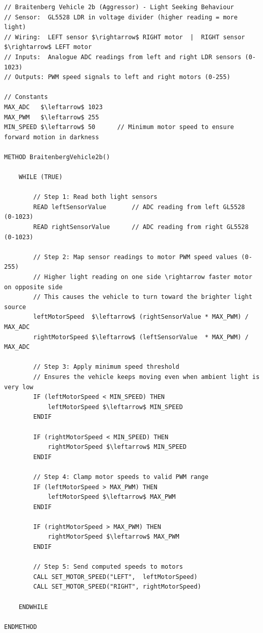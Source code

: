 \documentclass[11 pt , a 4 paper ]{article}
\theoremstyle{definition}
\begin{document}
\begin{lstlisting}[mathescape=true]
// Braitenberg Vehicle 2b (Aggressor) - Light Seeking Behaviour
// Sensor:  GL5528 LDR in voltage divider (higher reading = more light)
// Wiring:  LEFT sensor $\rightarrow$ RIGHT motor  |  RIGHT sensor $\rightarrow$ LEFT motor
// Inputs:  Analogue ADC readings from left and right LDR sensors (0-1023)
// Outputs: PWM speed signals to left and right motors (0-255)

// Constants
MAX_ADC   $\leftarrow$ 1023
MAX_PWM   $\leftarrow$ 255
MIN_SPEED $\leftarrow$ 50      // Minimum motor speed to ensure forward motion in darkness

METHOD BraitenbergVehicle2b()

    WHILE (TRUE)

        // Step 1: Read both light sensors
        READ leftSensorValue       // ADC reading from left GL5528  (0-1023)
        READ rightSensorValue      // ADC reading from right GL5528 (0-1023)

        // Step 2: Map sensor readings to motor PWM speed values (0-255)
        // Higher light reading on one side \rightarrow faster motor on opposite side
        // This causes the vehicle to turn toward the brighter light source
        leftMotorSpeed  $\leftarrow$ (rightSensorValue * MAX_PWM) / MAX_ADC
        rightMotorSpeed $\leftarrow$ (leftSensorValue  * MAX_PWM) / MAX_ADC

        // Step 3: Apply minimum speed threshold
        // Ensures the vehicle keeps moving even when ambient light is very low
        IF (leftMotorSpeed < MIN_SPEED) THEN
            leftMotorSpeed $\leftarrow$ MIN_SPEED
        ENDIF

        IF (rightMotorSpeed < MIN_SPEED) THEN
            rightMotorSpeed $\leftarrow$ MIN_SPEED
        ENDIF

        // Step 4: Clamp motor speeds to valid PWM range
        IF (leftMotorSpeed > MAX_PWM) THEN
            leftMotorSpeed $\leftarrow$ MAX_PWM
        ENDIF

        IF (rightMotorSpeed > MAX_PWM) THEN
            rightMotorSpeed $\leftarrow$ MAX_PWM
        ENDIF

        // Step 5: Send computed speeds to motors
        CALL SET_MOTOR_SPEED("LEFT",  leftMotorSpeed)
        CALL SET_MOTOR_SPEED("RIGHT", rightMotorSpeed)

    ENDWHILE

ENDMETHOD\end{lstlisting}
\end{document}
